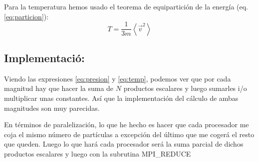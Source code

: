Para la temperatura hemos usado el teorema de equipartición de la energía (eq. \ref{eq:particion}):
\begin{equation}
T = \frac{1}{3m} \left\langle \vec{v}^2 \right\rangle
\label{eq:temp}
\end{equation}

\subsection{Implementació:}
Viendo las expresiones \ref{eq:presion} y \ref{eq:temp}, podemos ver que por cada magnitud hay que hacer la suma de $N$ productos escalares y luego sumarles i/o multiplicar unas constantes. Así que la implementación del cálculo de ambas magnitudes son muy parecidas.

En términos de paralelización, lo que he hecho es hacer que cada procesador me coja el mismo número de partículas a excepción del último que me cogerá el resto que queden. Luego lo que hará cada procesador será la suma parcial de dichos productos escalares y luego con la subrutina \textsf{MPI\_REDUCE}